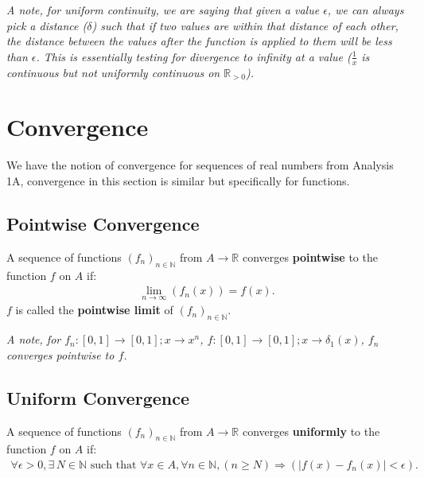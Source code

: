\documentclass[a4paper, 12pt, twoside]{article}
\begin{document}
\textit{A note, for uniform continuity, we are saying that given a value
      $\epsilon$, we can always pick a distance ($\delta$) such that
      if two values are within that distance of each other, the distance
      between the values after the function is applied to them
      will be less than $\epsilon$. This is essentially testing for
      divergence to infinity at a value ($\frac{1}{x}$ is continuous
      but not uniformly continuous on $\mathbb{R}_{>0}$).}

\newpage

\section{Convergence}

We have the notion of convergence for sequences of real numbers
from Analysis 1A, convergence in this section is similar but
specifically for functions.

\subsection{Pointwise Convergence}

A sequence of functions $(f_n)_{n \in \mathbb{N}}$ from
$A \to \mathbb{R}$ converges \textbf{pointwise} to the function
$f$ on $A$ if:
\begin{align*}
      \lim_{n \to \infty}(f_n(x)) = f(x). \tag{$\forall x \in A$}
\end{align*}
$f$ is called the \textbf{pointwise limit} of $(f_n)_{n \in \mathbb{N}}$.

\vspace{\baselineskip}

\textit{A note, for $f_n:[0, 1]\to[0, 1]; x \to x^n$,
$f:[0, 1] \to [0, 1]; x \to \delta_1(x)$, $f_n$ converges pointwise
to $f$.}

\subsection{Uniform Convergence}

A sequence of functions $(f_n)_{n \in \mathbb{N}}$ from
$A \to \mathbb{R}$ converges \textbf{uniformly} to the
function $f$ on $A$ if:
\begin{align*}
      \forall \epsilon > 0, \exists\,N \in \mathbb{N} \text{ such that }
      \forall x \in A, \forall n \in \mathbb{N},
      (n \geq N) \Rightarrow (|f(x) - f_n(x)| < \epsilon).
\end{align*}
\end{document}
